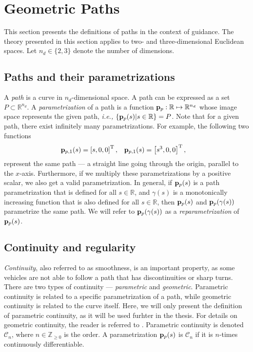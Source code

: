 \section{Geometric Paths}
\label{sec:background_paths}

This section presents the definitions of paths in the context of guidance.
The theory presented in this section applies to two- and three-dimensional Euclidean spaces.
Let $n_d \in \{2,3\}$ denote the number of dimensions.

\subsection{Paths and their parametrizations}
A \emph{path} is a curve in $n_d$-dimensional space.
A path can be expressed as a set $P \subset \mathbb{R}^{n_d}$.
A \emph{parametrization} of a path is a function $\mathbf{p}_p : \mathbb{R} \mapsto \mathbb{R}^{n_d}$ whose image space represents the given path, \emph{i.e.,} $\{\mathbf{p}_p(s) | s \in \mathbb{R}\} = P$.
Note that for a given path, there exist infinitely many parametrizations.
For example, the following two functions
\begin{align}
    \mathbf{p}_{p, 1}(s) &= \left[s, 0, 0\right]^{\mathrm{T}}, &
    \mathbf{p}_{p, 1}(s) &= \left[s^3, 0, 0\right]^{\mathrm{T}},
    \label{eq:background_path_example}
\end{align}
represent the same path --- a straight line going through the origin, parallel to the $x$-axis.
Furthermore, if we multiply these parametrizations by a positive scalar, we also get a valid parametrization.
In general, if $\mathbf{p}_p(s)$ is a path parametrization that is defined for all $s \in \mathbb{R}$, and $\gamma(s)$ is a monotonically increasing function that is also defined for all $s \in \mathbb{R}$, then $\mathbf{p}_p(s)$ and $\mathbf{p}_p(\gamma(s))$ parametrize the same path.
We will refer to $\mathbf{p}_p(\gamma(s))$ as a \emph{reparametrization} of $\mathbf{p}_p(s)$.

\subsection{Continuity and regularity}
\emph{Continuity}, also referred to as smoothness, is an important property, as some vehicles are not able to follow a path that has discontinuities or sharp turns.
There are two types of continuity --- \emph{parametric} and \emph{geometric}.
Parametric continuity is related to a specific parametrization of a path, while geometric continuity is related to the curve itself.
Here, we will only present the definition of parametric continuity, as it will be used furhter in the thesis.
For details on geometric continuity, the reader is referred to \cite{barsky_geometric_1984}.
Parametric continuity is denoted $\mathcal{C}_n$, where $n \in \mathbb{Z}_{\geq 0}$ is the order.
A parametrization $\mathbf{p}_p(s)$ is $\mathcal{C}_n$ if it is $n$-times continuously differentiable.

